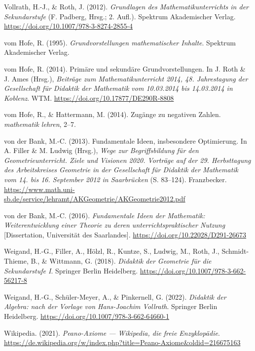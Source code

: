 \documentclass[
]{scrbook}
\newlength{\cslhangindent}
\newenvironment{CSLReferences}[2] %
 {\begin{list}{}{%
  \setlength{\itemindent}{0pt}
  \setlength{\leftmargin}{0pt}
  \setlength{\parsep}{0pt}
  \ifodd #1
   \setlength{\leftmargin}{\cslhangindent}
   \setlength{\itemindent}{-1\cslhangindent}
  \fi
  \setlength{\itemsep}{#2\baselineskip}}}
 {\end{list}}
\theoremstyle{definition}
\theoremstyle{definition}
\theoremstyle{definition}
\theoremstyle{definition}
\theoremstyle{remark}
\begin{document}
\begin{CSLReferences}{1}{0}
Vollrath, H.-J., \& Roth, J. (2012). \emph{Grundlagen des {Mathematikunterrichts} in der {Sekundarstufe}} (F. Padberg, Hrsg.; 2. Aufl.). Spektrum Akademischer Verlag. \url{https://doi.org/10.1007/978-3-8274-2855-4}

vom Hofe, R. (1995). \emph{Grundvorstellungen mathematischer {Inhalte}}. Spektrum Akademischer Verlag.

vom Hofe, R. (2014). Primäre und sekundäre {Grundvorstellungen}. In J. Roth \& J. Ames (Hrsg.), \emph{Beiträge zum {Mathematikunterricht} 2014, 48. {Jahrestagung} der {Gesellschaft} für {Didaktik} der {Mathematik} vom 10.03.2014 bis 14.03.2014 in {Koblenz}}. WTM. \url{https://doi.org/10.17877/DE290R-8808}

vom Hofe, R., \& Hattermann, M. (2014). Zugänge zu negativen {Zahlen}. \emph{mathematik lehren}, 2--7.

von der Bank, M.-C. (2013). Fundamentale {Ideen}, insbesondere {Optimierung}. In A. Filler \& M. Ludwig (Hrsg.), \emph{Wege zur {Begriffsbildung} für den {Geometrieunterricht}. {Ziele} und {Visionen} 2020. {Vorträge} auf der 29. {Herbsttagung} des {Arbeitskreises} {Geometrie} in der {Gesellschaft} für {Didaktik} der {Mathematik} vom 14. bis 16. {September} 2012 in {Saarbrücken}} (S. 83--124). Franzbecker. \url{https://www.math.uni-sb.de/service/lehramt/AKGeometrie/AKGeometrie2012.pdf}

von der Bank, M.-C. (2016). \emph{Fundamentale {Ideen} der {Mathematik}: {Weiterentwicklung} einer {Theorie} zu deren unterrichtspraktischer {Nutzung}} {[}Dissertation, Universität des Saarlandes{]}. \url{https://doi.org/10.22028/D291-26673}

Weigand, H.-G., Filler, A., Hölzl, R., Kuntze, S., Ludwig, M., Roth, J., Schmidt-Thieme, B., \& Wittmann, G. (2018). \emph{Didaktik der {Geometrie} für die {Sekundarstufe} {I}}. Springer Berlin Heidelberg. \url{https://doi.org/10.1007/978-3-662-56217-8}

Weigand, H.-G., Schüler-Meyer, A., \& Pinkernell, G. (2022). \emph{Didaktik der {Algebra}: nach der {Vorlage} von {Hans}-{Joachim} {Vollrath}}. Springer Berlin Heidelberg. \url{https://doi.org/10.1007/978-3-662-64660-1}

Wikipedia. (2021). \emph{Peano-Axiome --- Wikipedia{,} die freie Enzyklopädie}. \url{https://de.wikipedia.org/w/index.php?title=Peano-Axiome&oldid=216675163}


\end{CSLReferences}
\end{document}
